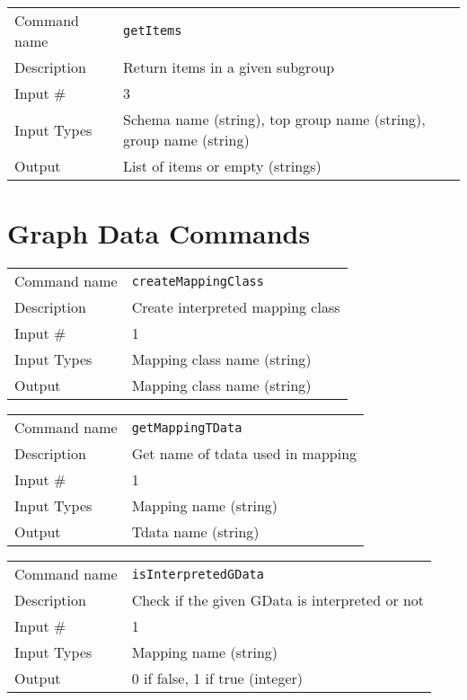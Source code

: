 \bigskip

\noindent
\begin{tabular}{l|p{5in}}
\hline
Command name & {\tt getItems} \\
Description  & Return items in a given subgroup \\
Input \#     & 3 \\
Input Types  & Schema name (string), top group name (string), group name
              (string) \\
Output       & List of items or empty (strings) \\
\hline
\end{tabular}

\section{Graph Data Commands}

\noindent
\begin{tabular}{l|p{5in}}
\hline
Command name & {\tt createMappingClass} \\
Description  & Create interpreted mapping class \\
Input \#     & 1 \\
Input Types  & Mapping class name (string) \\
Output       & Mapping class name (string) \\
\hline
\end{tabular}

\bigskip

\noindent
\begin{tabular}{l|p{5in}}
\hline
Command name & {\tt getMappingTData} \\
Description  & Get name of tdata used in mapping \\
Input \#     & 1 \\
Input Types  & Mapping name (string) \\
Output       & Tdata name (string) \\
\hline
\end{tabular}

\bigskip

\noindent
\begin{tabular}{l|p{5in}}
\hline
Command name & {\tt isInterpretedGData} \\
Description  & Check if the given GData is interpreted or not \\
Input \#     & 1 \\
Input Types  & Mapping name (string) \\
Output       & 0 if false, 1 if true (integer) \\
\hline
\end{tabular}

